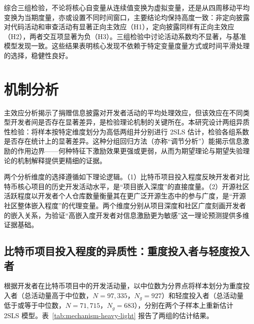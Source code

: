 \documentclass[
    type = master, %
    degree = professional,        %
    decl-page,  %
    twoside,                %
    fontset = fandol %
  ]{njuthesis}
\begin{document}
综合三组检验，不论将核心自变量从连续值变换为虚拟变量，还是从四周移动平均变换为当期度量，亦或设置不同时间窗口，主要结论均保持高度一致：非定向披露对代码活动和审查活动有显著正向主效应（H1），定向披露同样有正向主效应（H2），两者交互项显著为负（H3）。三组检验中讨论活动系数均不显著，与基准模型发现一致。这些结果表明核心发现不依赖于特定变量度量方式或时间平滑处理的选择，稳健性良好。

\section{机制分析}
\label{sec:mechanism-1}

主效应分析揭示了捐赠信息披露对开发者活动的平均处理效应，但该效应在不同类型开发者间是否存在显著差异，是检验理论机制的关键所在。本研究设计两组异质性检验：将样本按特定维度划分为高低两组并分别进行 2SLS 估计，检验各组系数是否存在统计上的显著差异。这种分组回归方法（亦称“调节分析”）能揭示信息激励的作用边界——何种特征下激励效果更强或更弱，从而为期望理论与期望失验理论的机制解释提供更精细的证据。

两个分析维度的选择遵循如下理论逻辑。（1）比特币项目投入程度反映开发者对比特币核心项目的历史开发活动水平，是“项目嵌入深度”的直接度量。（2）开源社区活跃程度以开发者个人仓库数量衡量其在更广泛开源生态中的参与广度，是“开源社区整体嵌入程度”的代理变量。两个维度分别从项目深度和社区广度刻画开发者的嵌入关系，为验证“高嵌入度开发者对信息激励更为敏感”这一理论预测提供多维证据基础。

\subsection{比特币项目投入程度的异质性：重度投入者与轻度投入者}

根据开发者在比特币项目中的开发活动量，以中位数为分界点将样本划分为重度投入者（总活动量高于中位数，$N = 97{,}335$，$N_g = 927$）和轻度投入者（总活动量低于或等于中位数，$N = 71{,}715$，$N_g = 683$），分别在两个子样本上重新估计 2SLS 模型。表~\ref{tab:mechanism-heavy-light} 报告了两组的估计结果。
\end{document}
